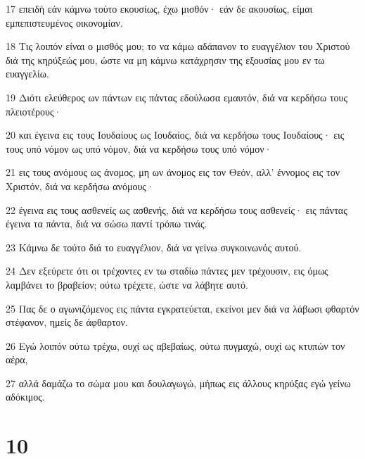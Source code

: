 \par 17 επειδή εάν κάμνω τούτο εκουσίως, έχω μισθόν· εάν δε ακουσίως, είμαι εμπεπιστευμένος οικονομίαν.
\par 18 Τις λοιπόν είναι ο μισθός μου; το να κάμω αδάπανον το ευαγγέλιον του Χριστού διά της κηρύξεώς μου, ώστε να μη κάμνω κατάχρησιν της εξουσίας μου εν τω ευαγγελίω.
\par 19 Διότι ελεύθερος ων πάντων εις πάντας εδούλωσα εμαυτόν, διά να κερδήσω τους πλειοτέρους·
\par 20 και έγεινα εις τους Ιουδαίους ως Ιουδαίος, διά να κερδήσω τους Ιουδαίους· εις τους υπό νόμον ως υπό νόμον, διά να κερδήσω τους υπό νόμον·
\par 21 εις τους ανόμους ως άνομος, μη ων άνομος εις τον Θεόν, αλλ' έννομος εις τον Χριστόν, διά να κερδήσω ανόμους·
\par 22 έγεινα εις τους ασθενείς ως ασθενής, διά να κερδήσω τους ασθενείς· εις πάντας έγεινα τα πάντα, διά να σώσω παντί τρόπω τινάς.
\par 23 Κάμνω δε τούτο διά το ευαγγέλιον, διά να γείνω συγκοινωνός αυτού.
\par 24 Δεν εξεύρετε ότι οι τρέχοντες εν τω σταδίω πάντες μεν τρέχουσιν, εις όμως λαμβάνει το βραβείον; ούτω τρέχετε, ώστε να λάβητε αυτό.
\par 25 Πας δε ο αγωνιζόμενος εις πάντα εγκρατεύεται, εκείνοι μεν διά να λάβωσι φθαρτόν στέφανον, ημείς δε άφθαρτον.
\par 26 Εγώ λοιπόν ούτω τρέχω, ουχί ως αβεβαίως, ούτω πυγμαχώ, ουχί ως κτυπών τον αέρα,
\par 27 αλλά δαμάζω το σώμα μου και δουλαγωγώ, μήπως εις άλλους κηρύξας εγώ γείνω αδόκιμος.

\chapter{10}


